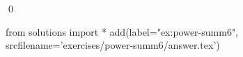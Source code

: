 
\begin{ex} 
  \label{ex:power-summ6}
  
  \qed
\end{ex} 
\begin{python0}
from solutions import *
add(label="ex:power-summ6",
    srcfilename='exercises/power-summ6/answer.tex') 
\end{python0}

